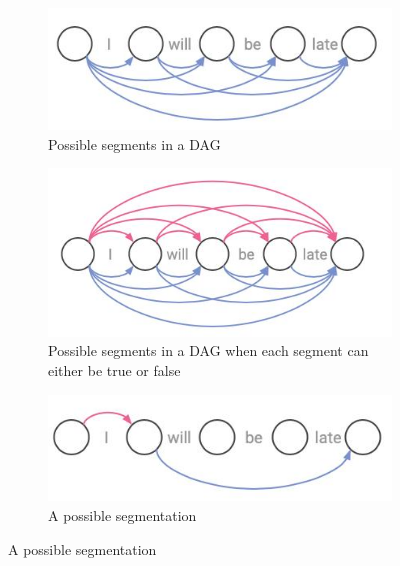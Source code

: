 \begin{figure}
    \centering
    \begin{subfigure}[b]{0.45\textwidth}
        \centering
        \includegraphics[width=\textwidth]{figs/segmentation1.jpeg}
        \caption{Possible segments in a DAG}
        \label{fig:dag}
    \end{subfigure}
    \hfill
    \begin{subfigure}[b]{0.45\textwidth}
        \centering
        \includegraphics[width=\textwidth]{figs/segmentation2.jpeg}
        \caption{Possible segments in a DAG when each segment can either be true or false}
        \label{fig:dag2}
    \end{subfigure}
    \hfill
    \begin{subfigure}[b]{0.45\textwidth}
        \centering
        \includegraphics[width=\textwidth]{figs/segmentation3.jpeg}
        \caption{A possible segmentation}
        \label{fig:segmentation}
    \end{subfigure}
    \hfill

\end{figure}
